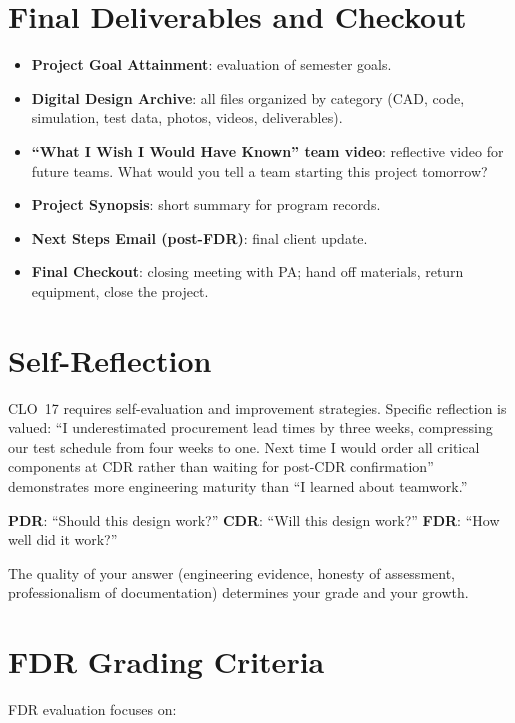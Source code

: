 \section{Final Deliverables and Checkout}
\begin{itemize}[nosep,leftmargin=1.5em]
\item \textbf{Project Goal Attainment}: evaluation of semester goals.
\item \textbf{Digital Design Archive}: all files organized by category (CAD, code, simulation, test data, photos, videos, deliverables).
\item \textbf{``What I Wish I Would Have Known'' team video}: reflective video for future teams. What would you tell a team starting this project tomorrow?
\item \textbf{Project Synopsis}: short summary for program records.
\item \textbf{Next Steps Email (post-FDR)}: final client update.
\item \textbf{Final Checkout}: closing meeting with PA; hand off materials, return equipment, close the project.
\end{itemize}

\section{Self-Reflection}
CLO~17 requires self-evaluation and improvement strategies. Specific reflection is valued: ``I underestimated procurement lead times by three weeks, compressing our test schedule from four weeks to one. Next time I would order all critical components at CDR rather than waiting for post-CDR confirmation'' demonstrates more engineering maturity than ``I learned about teamwork.''

\begin{keyconceptbox}
\textbf{PDR}: ``Should this design work?'' \textbf{CDR}: ``Will this design work?'' \textbf{FDR}: ``How well did it work?''

The quality of your answer (engineering evidence, honesty of assessment, professionalism of documentation) determines your grade and your growth.
\end{keyconceptbox}


\section{FDR Grading Criteria}
FDR evaluation focuses on:

